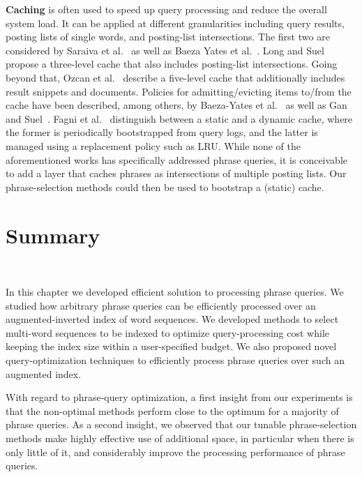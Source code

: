 \textbf{Caching} is often used to speed up query processing and reduce
the overall system load. It can be applied at different granularities
including query results, posting lists of single words, and
posting-list intersections. The first two are considered by Saraiva et
al.~\cite{Saraiva:2001} as well as Baeza Yates et
al.~\cite{baeza2008design}. Long and Suel~\cite{Long:2006fk}
propose a three-level cache that also includes posting-list
intersections. Going beyond that, Ozcan et al.~\cite{Ozcan:2012fk}
describe a five-level cache that additionally includes result snippets
and documents. Policies for admitting/evicting items to/from the cache
have been described, among others, by Baeza-Yates et
al.~\cite{Baeza-Yates:2007adm} as well as Gan and
Suel~\cite{Gan:2009}. Fagni et al.~\cite{Fagni:2006} distinguish
between a static and a dynamic cache, where the former is periodically
bootstrapped from query logs, and the latter is managed using a
replacement policy such as LRU. While none of the aforementioned works
has specifically addressed phrase queries, it is conceivable to add a
layer that caches phrases as intersections of multiple posting
lists. Our phrase-selection methods could then be used to bootstrap a
(static) cache.

\section{Summary}
~\label{chap:phrases:sec:conclusion}

In this chapter we developed efficient solution to processing phrase queries. We studied how arbitrary phrase queries can be efficiently processed over an augmented-inverted index of word sequences. We developed methods to select multi-word sequences to be indexed to optimize query-processing cost while keeping the index size within a user-specified budget. We also proposed novel query-optimization techniques to efficiently process phrase queries over such an augmented index.

With regard to phrase-query optimization, a first
insight from our experiments is that the non-optimal methods perform
close to the optimum for a majority of phrase queries. As a second
insight, we observed that our tunable phrase-selection methods make
highly effective use of additional space, in particular when there is
only little of it, and considerably improve the processing performance
of phrase queries.
